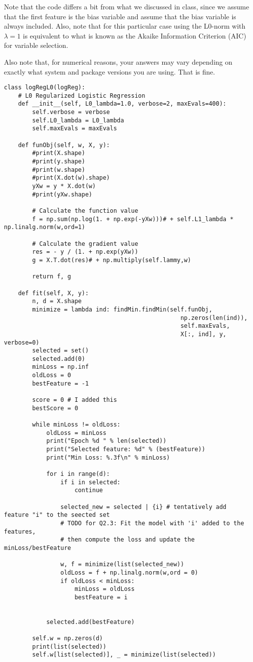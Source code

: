 \documentclass{article}
\begin{document}
Note that the code differs a bit from what we discussed in class,
since we assume that the first feature is the bias variable and assume that the
bias variable is always included. Also, note that for this particular case using
the L0-norm with $\lambda=1$ is equivalent to what is known as the Akaike
Information Criterion (AIC) for variable selection.

Also note that, for numerical reasons, your answers may vary depending on exactly what system and package versions you are using. That is fine.

\begin{lstlisting}
class logRegL0(logReg):
    # L0 Regularized Logistic Regression
    def __init__(self, L0_lambda=1.0, verbose=2, maxEvals=400):
        self.verbose = verbose
        self.L0_lambda = L0_lambda
        self.maxEvals = maxEvals

    def funObj(self, w, X, y):
        #print(X.shape)
        #print(y.shape)
        #print(w.shape)
        #print(X.dot(w).shape)
        yXw = y * X.dot(w)
        #print(yXw.shape)

        # Calculate the function value
        f = np.sum(np.log(1. + np.exp(-yXw)))# + self.L1_lambda * np.linalg.norm(w,ord=1)

        # Calculate the gradient value
        res = - y / (1. + np.exp(yXw))
        g = X.T.dot(res)# + np.multiply(self.lammy,w)

        return f, g

    def fit(self, X, y):
        n, d = X.shape
        minimize = lambda ind: findMin.findMin(self.funObj,
                                                  np.zeros(len(ind)),
                                                  self.maxEvals,
                                                  X[:, ind], y, verbose=0)
        selected = set()
        selected.add(0)
        minLoss = np.inf
        oldLoss = 0
        bestFeature = -1

        score = 0 # I added this
        bestScore = 0

        while minLoss != oldLoss:
            oldLoss = minLoss
            print("Epoch %d " % len(selected))
            print("Selected feature: %d" % (bestFeature))
            print("Min Loss: %.3f\n" % minLoss)

            for i in range(d):
                if i in selected:
                    continue

                selected_new = selected | {i} # tentatively add feature "i" to the seected set
                # TODO for Q2.3: Fit the model with 'i' added to the features,
                # then compute the loss and update the minLoss/bestFeature
                
                w, f = minimize(list(selected_new))
                oldLoss = f + np.linalg.norm(w,ord = 0)
                if oldLoss < minLoss:
                    minLoss = oldLoss
                    bestFeature = i
                

            selected.add(bestFeature)

        self.w = np.zeros(d)
        print(list(selected))
        self.w[list(selected)], _ = minimize(list(selected))
\end{lstlisting}
\end{document}
